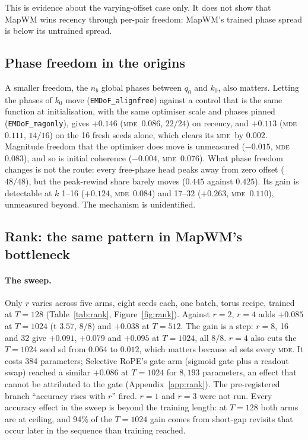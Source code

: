 \documentclass[10pt]{article}
\newcommand{\mde}{\textsc{mde}}
\newcommand{\nb}{n_b}
\newcommand{\arm}[1]{\texttt{#1}}
\begin{document}
This is evidence about the varying-offset case only. It does not show that MapWM wins recency through
per-pair freedom: MapWM's trained phase spread is below its untrained spread.

\subsection{Phase freedom in the origins}
\label{sec:c4-phase}

A smaller freedom, the $\nb$ global phases between $q_0$ and $k_0$, also matters. Letting the phases of
$k_0$ move (\arm{EMDoF\_alignfree}) against a control that is the same function at initialisation, with
the same optimiser scale and phases pinned (\arm{EMDoF\_magonly}), gives $+0.146$ (\mde\ $0.086$, $22/24$)
on recency, and $+0.113$ (\mde\ $0.111$, $14/16$) on the 16 fresh seeds alone, which clears its \mde\ by
$0.002$. Magnitude freedom that the optimiser does move is unmeasured ($-0.015$, \mde\ $0.083$), and so is
initial coherence ($-0.004$, \mde\ $0.076$). What phase freedom changes is not the route: every free-phase
head peaks away from zero offset ($48/48$), but the peak-rewind share barely moves ($0.445$ against
$0.425$). Its gain is detectable at $k$ 1--16 ($+0.124$, \mde\ $0.084$) and 17--32 ($+0.263$, \mde\ $0.110$),
unmeasured beyond. The mechanism is unidentified. %

\subsection{Rank: the same pattern in MapWM's bottleneck}
\label{sec:c3-rank}

\paragraph{The sweep.} Only $r$ varies across five arms, eight seeds each, one batch, torus recipe, trained at
$T=128$ (Table~\ref{tab:rank}, Figure~\ref{fig:rank}). Against $r=2$, $r=4$ adds $+0.085$ at $T=1024$ (t
$3.57$, $8/8$) and $+0.038$ at $T=512$. The gain is a step: $r=8$, 16 and 32 give $+0.091$, $+0.079$ and
$+0.095$ at $T=1024$, all $8/8$. $r=4$ also cuts the $T=1024$ seed sd from $0.064$ to $0.012$, which
matters because sd sets every \mde. It costs 384 parameters; Selective RoPE's gate arm (sigmoid gate plus a readout swap) reached a
similar $+0.086$ at $T=1024$ for $8{,}193$ parameters, an effect that cannot be attributed to the gate (Appendix~\ref{app:rank}). The pre-registered
branch ``accuracy rises with $r$'' fired. $r=1$ and $r=3$ were not run. Every accuracy effect in the sweep is
beyond the training length: at $T=128$ both arms are at ceiling, and 94\% of the $T=1024$ gain comes from
short-gap revisits that occur later in the sequence than training reached. %
\end{document}
